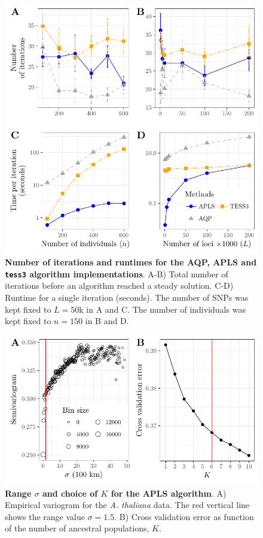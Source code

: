 \begin{figure}
  \centering
  \includegraphics{./Figures/figure4.pdf}
  \caption{{\bf Number of iterations and runtimes for the AQP, APLS and {\tt
        tess3} algorithm implementations}. A-B) Total number of iterations
    before an algorithm reached a steady solution. C-D) Runtime for a single
    iteration (seconds). The number of SNPs was kept fixed to $L = 50$k in A and
    C. The number of individuals was kept fixed to $n = 150$ in B and D.}
  \label{fig:fig4}
\end{figure}

\clearpage 
\newpage

\begin{figure}
  \centering
\includegraphics{./Figures/figure5.pdf}
\caption{{\bf Range $\sigma$ and choice of $K$ for the APLS algorithm}. A)
  Empirical variogram for the {\it A. thaliana} data. The red vertical line
  shows the range value $\sigma = 1.5$. B) Cross validation error as function of
  the number of ancestral populations, $K$.}
  \label{fig:fig5}
\end{figure}

